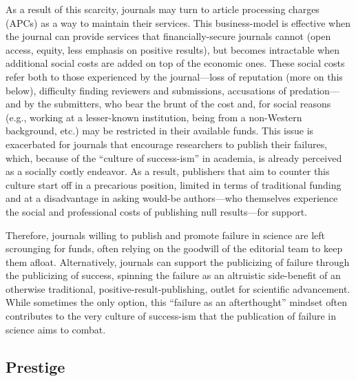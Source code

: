 \documentclass[editorial, authordate,twocolumn,issue]{jote-new-article}
\begin{document}
As a result of this scarcity, journals may turn to article processing charges (APCs) as a way to maintain their services. This business-model is effective when the journal can provide services that financially-secure journals cannot (open access, equity, less emphasis on positive results), but becomes intractable when additional social costs are added on top of the economic ones. These social costs refer both to those experienced by the journal—loss of reputation (more on this below), difficulty finding reviewers and submissions, accusations of predation—and by the submitters, who bear the brunt of the cost and, for social reasons (e.g., working at a lesser-known institution, being from a non-Western background, etc.) may be restricted in their available funds. This issue is exacerbated for journals that encourage researchers to publish their failures, which, because of the “culture of success-ism” in academia, is already perceived as a socially costly endeavor. As a result, publishers that aim to counter this culture start off in a precarious position, limited in terms of traditional funding and at a disadvantage in asking would-be authors—who themselves experience the social and professional costs of publishing null results—for support. 

Therefore, journals willing to publish and promote failure in science are left scrounging for funds, often relying on the goodwill of the editorial team to keep them afloat. Alternatively, journals can support the publicizing of failure through the publicizing of success, spinning the failure as an altruistic side-benefit of an otherwise traditional, positive-result-publishing, outlet for scientific advancement. While sometimes the only option, this “failure as an afterthought” mindset often contributes to the very culture of success-ism that the publication of failure in science aims to combat. 



\subsection{Prestige}
\end{document}
